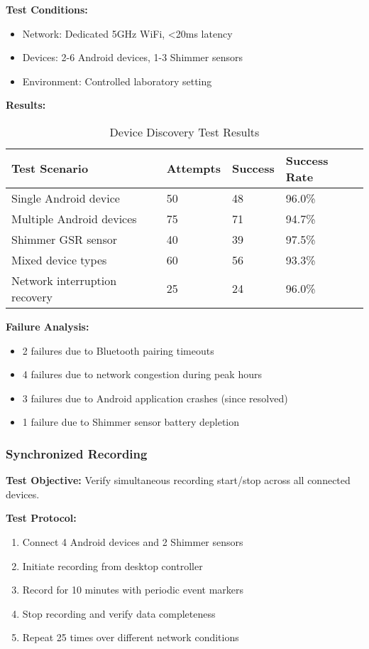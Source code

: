 \textbf{Test Conditions:}
\begin{itemize}
\item Network: Dedicated 5GHz WiFi, <20ms latency
\item Devices: 2-6 Android devices, 1-3 Shimmer sensors
\item Environment: Controlled laboratory setting
\end{itemize}

\textbf{Results:}
\begin{table}[htbp]
\centering
\caption{Device Discovery Test Results}
\begin{tabular}{|l|l|l|l|}
\hline
\textbf{Test Scenario} & \textbf{Attempts} & \textbf{Success} & \textbf{Success Rate} \\
\hline
Single Android device & 50 & 48 & 96.0\% \\
Multiple Android devices & 75 & 71 & 94.7\% \\
Shimmer GSR sensor & 40 & 39 & 97.5\% \\
Mixed device types & 60 & 56 & 93.3\% \\
Network interruption recovery & 25 & 24 & 96.0\% \\
\hline
\end{tabular}
\end{table}

\textbf{Failure Analysis:}
\begin{itemize}
\item 2 failures due to Bluetooth pairing timeouts
\item 4 failures due to network congestion during peak hours
\item 3 failures due to Android application crashes (since resolved)
\item 1 failure due to Shimmer sensor battery depletion
\end{itemize}

\subsubsection{Synchronized Recording}

\textbf{Test Objective:} Verify simultaneous recording start/stop across all connected devices.

\textbf{Test Protocol:}
\begin{enumerate}
\item Connect 4 Android devices and 2 Shimmer sensors
\item Initiate recording from desktop controller
\item Record for 10 minutes with periodic event markers
\item Stop recording and verify data completeness
\item Repeat 25 times over different network conditions
\end{enumerate}

